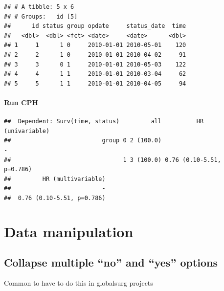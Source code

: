 \documentclass[]{book}
\newenvironment{Shaded}{\begin{snugshade}}{\end{snugshade}}
\newcommand{\KeywordTok}[1]{\textcolor[rgb]{0.13,0.29,0.53}{\textbf{#1}}}
\newcommand{\NormalTok}[1]{#1}
\newcommand{\OperatorTok}[1]{\textcolor[rgb]{0.81,0.36,0.00}{\textbf{#1}}}
\newcommand{\StringTok}[1]{\textcolor[rgb]{0.31,0.60,0.02}{#1}}
\begin{document}
\begin{verbatim}
## # A tibble: 5 x 6
## # Groups:   id [5]
##      id status group opdate     status_date  time
##   <dbl>  <dbl> <fct> <date>     <date>      <dbl>
## 1     1      1 0     2010-01-01 2010-05-01    120
## 2     2      1 0     2010-01-01 2010-04-02     91
## 3     3      0 1     2010-01-01 2010-05-03    122
## 4     4      1 1     2010-01-01 2010-03-04     62
## 5     5      1 1     2010-01-01 2010-04-05     94
\end{verbatim}

\hypertarget{run-cph}{%
\subsubsection{Run CPH}\label{run-cph}}

\begin{Shaded}
\end{Shaded}

\begin{verbatim}
##  Dependent: Surv(time, status)         all          HR (univariable)
##                          group 0 2 (100.0)                         -
##                                1 3 (100.0) 0.76 (0.10-5.51, p=0.786)
##         HR (multivariable)
##                          -
##  0.76 (0.10-5.51, p=0.786)
\end{verbatim}

\hypertarget{data-manipulation}{%
\chapter{Data manipulation}\label{data-manipulation}}

\hypertarget{collapse-multiple-no-and-yes-options}{%
\section{Collapse multiple ``no'' and ``yes'' options}\label{collapse-multiple-no-and-yes-options}}

Common to have to do this in globalsurg projects
\end{document}

